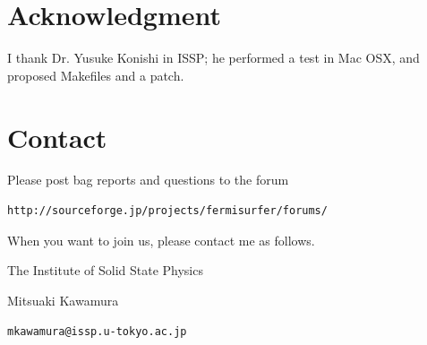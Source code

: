 \documentclass[12pt]{article}
\begin{document}
\section{Acknowledgment}

I thank Dr. Yusuke Konishi in ISSP;
he performed a test in Mac OSX,
and proposed Makefiles and a patch.

\section{Contact}

Please post bag reports and questions to the forum
\begin{verbatim}
http://sourceforge.jp/projects/fermisurfer/forums/
\end{verbatim}

When you want to join us, please contact me as follows.

The Institute of Solid State Physics

Mitsuaki Kawamura

\verb|mkawamura@issp.u-tokyo.ac.jp|
\end{document}
